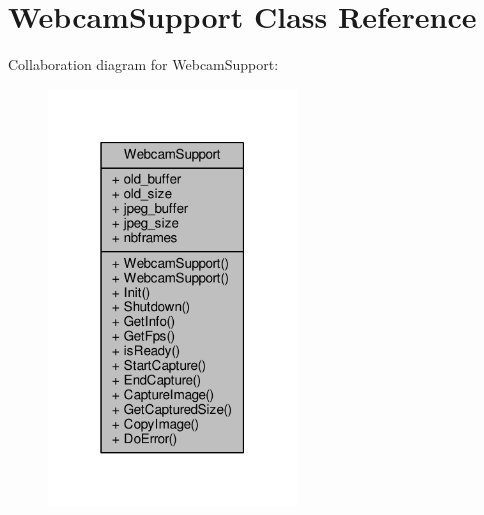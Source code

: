\hypertarget{classWebcamSupport}{}\section{Webcam\+Support Class Reference}
\label{classWebcamSupport}


Collaboration diagram for Webcam\+Support\+:
\nopagebreak
\begin{figure}[H]
\begin{center}
\leavevmode
\includegraphics[width=187pt]{d7/d8c/classWebcamSupport__coll__graph}
\end{center}
\end{figure}
